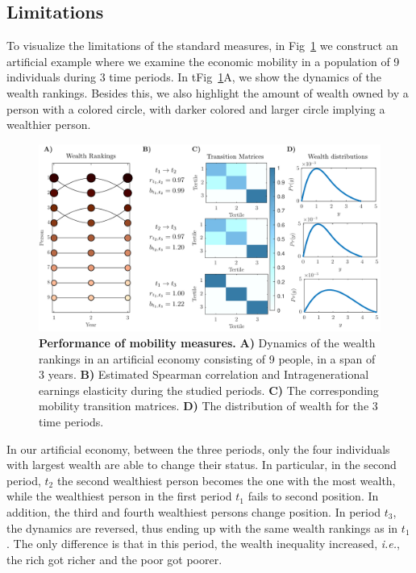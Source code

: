 \documentclass[11pt]{article}
\newcommand{\ie}{{\it i.e.}\xspace}
\numberwithin{equation}{section}
\begin{document}
\subsection{Limitations}

To visualize the limitations of the standard measures, in Fig~\ref{fig:standard-mobility-measures} we construct an artificial example where we examine the economic mobility in a population of 9 individuals during 3 time periods. In tFig~\ref{fig:standard-mobility-measures}A, we show the dynamics of the wealth rankings. Besides this, we also highlight the amount of wealth owned by a person with a colored circle, with darker colored and larger circle implying a wealthier person. 
\begin{figure}[t!]
\includegraphics[width=\linewidth]{figs/fig_mobility_measures.pdf}
\caption{\textbf{Performance of mobility measures.} \textbf{A)} Dynamics of the wealth rankings in an artificial economy consisting of 9 people, in a span of 3 years. \textbf{B)} Estimated Spearman correlation and Intragenerational earnings elasticity during the studied periods. \textbf{C)} The corresponding mobility transition matrices. \textbf{D)} The distribution of wealth for the 3 time periods. \label{fig:standard-mobility-measures}}
\end{figure}

In our artificial economy, between the three periods, only the four individuals with largest wealth are able to change their status. In particular, in the second period, $t_2$ the second wealthiest person becomes the one with the most wealth, while the wealthiest person in the first period $t_1$ fails to second position. In addition, the third and fourth wealthiest persons change position. In period $t_3$, the dynamics are reversed, thus ending up with the same wealth rankings as in $t_1$. The only difference is that in this period, the wealth inequality increased, \ie, the rich got richer and the poor got poorer. 
\end{document}
